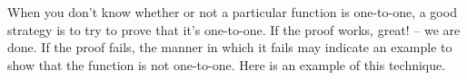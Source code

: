 



 

When you don't know whether or not a particular function is one-to-one, a good strategy is to try to prove that it's one-to-one.  If the proof works, great! -- we are done.  If the proof fails, the manner in which it fails may indicate an example to show that the function is not one-to-one.  Here is an example of this technique.


